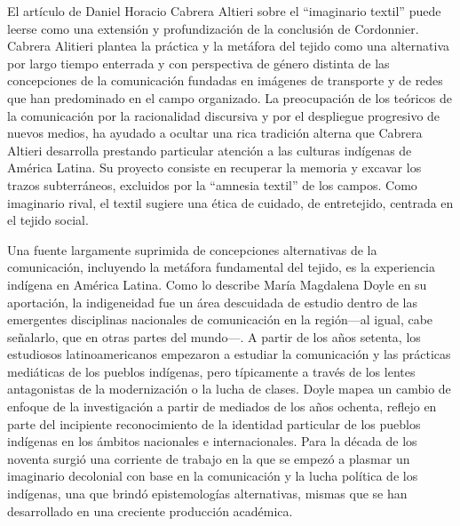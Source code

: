 \documentclass{tufte-handout}
\begin{document}
El artículo de Daniel Horacio Cabrera Altieri sobre el ``imaginario
textil'' puede leerse como una extensión y profundización de la
conclusión de Cordonnier. Cabrera Alitieri plantea la práctica y la
metáfora del tejido como una alternativa por largo tiempo enterrada y
con perspectiva de género distinta de las concepciones de la
comunicación fundadas en imágenes de transporte y de redes que han
predominado en el campo organizado. La preocupación de los teóricos de
la comunicación por la racionalidad discursiva y por el despliegue
progresivo de nuevos medios, ha ayudado a ocultar una rica tradición
alterna que Cabrera Altieri desarrolla prestando particular atención a
las culturas indígenas de América Latina. Su proyecto consiste en
recuperar la memoria y excavar los trazos subterráneos, excluidos por la
``amnesia textil'' de los campos. Como imaginario rival, el textil
sugiere una ética de cuidado, de entretejido, centrada en el tejido
social.

Una fuente largamente suprimida de concepciones alternativas de la
comunicación, incluyendo la metáfora fundamental del tejido, es la
experiencia indígena en América Latina. Como lo describe María Magdalena
Doyle en su aportación, la indigeneidad fue un área descuidada de
estudio dentro de las emergentes disciplinas nacionales de comunicación
en la región---al igual, cabe señalarlo, que en otras partes del
mundo---. A partir de los años setenta, los estudiosos latinoamericanos
empezaron a estudiar la comunicación y las prácticas mediáticas de los
pueblos indígenas, pero típicamente a través de los lentes antagonistas
de la modernización o la lucha de clases. Doyle mapea un cambio de
enfoque de la investigación a partir de mediados de los años ochenta,
reflejo en parte del incipiente reconocimiento de la identidad
particular de los pueblos indígenas en los ámbitos nacionales e
internacionales. Para la década de los noventa surgió una corriente de
trabajo en la que se empezó a plasmar un imaginario decolonial con base
en la comunicación y la lucha política de los indígenas, una que brindó
epistemologías alternativas, mismas que se han desarrollado en una
creciente producción académica.
\end{document}
